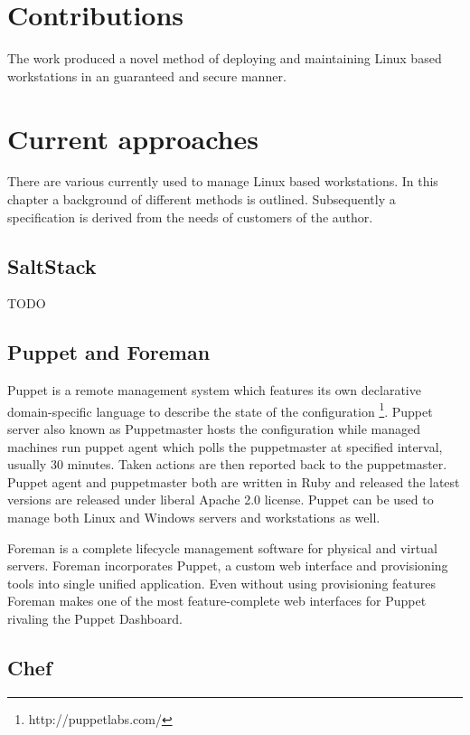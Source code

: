 \documentclass{article}
\begin{document}
\section{Contributions}

The work produced a novel method of deploying and maintaining Linux
based workstations in an guaranteed and secure manner.

\section{Current approaches}

There are various  currently used to manage Linux based workstations.
In this chapter a background of different methods is outlined.
Subsequently a specification is derived from the needs of customers of
the author. 


\subsection{SaltStack}
TODO

\subsection{Puppet and Foreman}

Puppet is a remote management system which features its own declarative
domain-specific language to describe the state of the configuration
\footnote{http://puppetlabs.com/}. Puppet server also known as Puppetmaster
hosts the configuration while managed machines run puppet agent which polls
the puppetmaster at specified interval, usually 30 minutes. Taken actions
are then reported back to the puppetmaster. Puppet agent and puppetmaster
both are written in Ruby and released the latest versions are released under
liberal Apache 2.0 license. Puppet can be used to manage both Linux and
Windows servers and workstations as well.

Foreman is a complete lifecycle management software for physical and virtual
servers. Foreman incorporates Puppet, a custom web interface and provisioning
tools into single unified application. Even without using provisioning features
Foreman makes one of the most feature-complete web interfaces for Puppet
rivaling the Puppet Dashboard.

\subsection{Chef}
\end{document}
